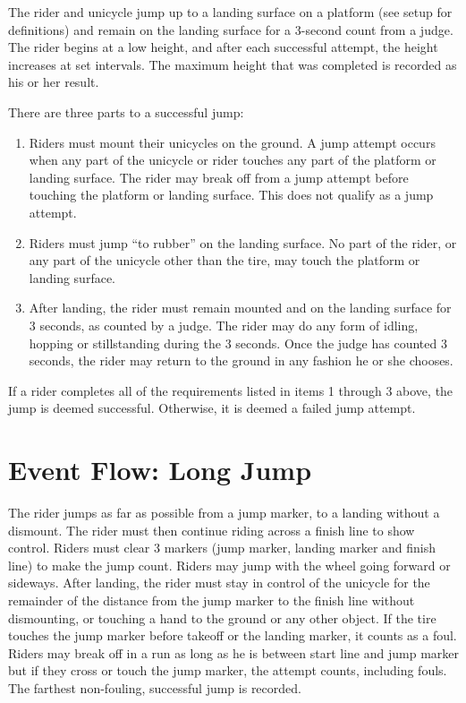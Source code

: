The rider and unicycle jump up to a landing surface on a platform (see setup for definitions) and remain on the landing surface for a 3-second count from a judge.
The rider begins at a low height, and after each successful attempt, the height increases at set intervals.
The maximum height that was completed is recorded as his or her result.

There are three parts to a successful jump:
\begin{enumerate}
\item Riders must mount their unicycles on the ground.
A jump attempt occurs when any part of the unicycle or rider touches any part of the platform or landing surface.
The rider may break off from a jump attempt before touching the platform or landing surface.
This does not qualify as a jump attempt.
\item Riders must jump ``to rubber'' on the landing surface.
No part of the rider, or any part of the unicycle other than the tire, may touch the platform or landing surface.
\item After landing, the rider must remain mounted and on the landing surface for 3 seconds, as counted by a judge.
The rider may do any form of idling, hopping or stillstanding during the 3 seconds.
Once the judge has counted 3 seconds, the rider may return to the ground in any fashion he or she chooses.
\end{enumerate}
If a rider completes all of the requirements listed in items 1 through 3 above, the jump is deemed successful.
Otherwise, it is deemed a failed jump attempt.

\section{Event Flow: Long Jump}
The rider jumps as far as possible from a jump marker, to a landing without a dismount.
The rider must then continue riding across a finish line to show control.
Riders must clear 3 markers (jump marker, landing marker and finish line) to make the jump count.
Riders may jump with the wheel going forward or sideways.
After landing, the rider must stay in control of the unicycle for the remainder of the distance from the jump marker to the finish line without dismounting, or touching a hand to the ground or any other object.
If the tire touches the jump marker before takeoff or the landing marker, it counts as a foul.
Riders may break off in a run as long as he is between start line and jump marker but if they cross or touch the jump marker, the attempt counts, including fouls.
The farthest non-fouling, successful jump is recorded.

